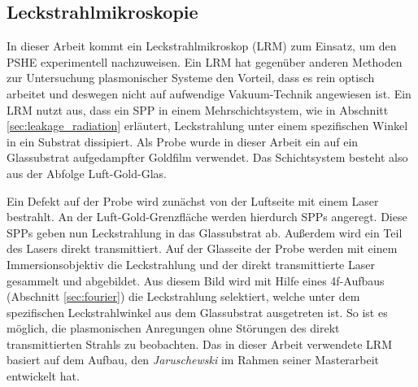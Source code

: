 \documentclass[titlepage,  ngerman]{article}
\begin{document}
	\subsection{Leckstrahlmikroskopie}
	In dieser Arbeit kommt ein Leckstrahlmikroskop (LRM) zum Einsatz, um den PSHE experimentell nachzuweisen. Ein LRM hat gegenüber anderen Methoden zur Untersuchung plasmonischer Systeme den Vorteil, dass es rein optisch arbeitet und deswegen nicht auf aufwendige Vakuum-Technik angewiesen ist. Ein LRM nutzt aus, dass ein SPP in einem Mehrschichtsystem, wie in Abschnitt \ref{sec:leakage_radiation} erläutert, Leckstrahlung unter einem spezifischen Winkel in ein Substrat dissipiert. Als Probe wurde in dieser Arbeit ein auf ein Glassubstrat aufgedampfter Goldfilm verwendet. Das Schichtsystem besteht also aus der Abfolge Luft-Gold-Glas.
	
	Ein Defekt auf der Probe wird zunächst von der Luftseite mit einem Laser bestrahlt. An der Luft-Gold-Grenzfläche werden hierdurch SPPs angeregt. Diese SPPs geben nun Leckstrahlung in das Glassubstrat ab.
	Außerdem wird ein Teil des Lasers direkt transmittiert. Auf der Glasseite der Probe werden mit einem Immersionsobjektiv die Leckstrahlung und der direkt transmittierte Laser gesammelt und abgebildet.	
	Aus diesem Bild wird mit Hilfe eines 4f-Aufbaus (Abschnitt \ref{sec:fourier}) die Leckstrahlung selektiert, welche unter dem spezifischen Leckstrahlwinkel aus dem Glassubstrat ausgetreten ist. So ist es möglich, die plasmonischen Anregungen ohne Störungen des direkt transmittierten Strahls zu beobachten. Das in dieser Arbeit verwendete LRM basiert auf dem Aufbau, den \textit{Jaruschewski} im Rahmen seiner Masterarbeit \cite{Jaruschewski.2020} entwickelt hat.
\end{document}
